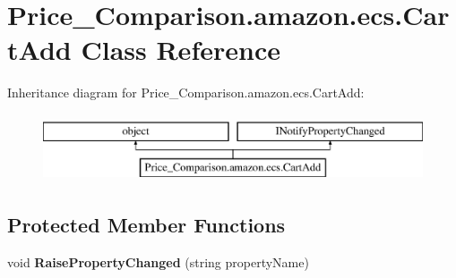 \hypertarget{class_price___comparison_1_1amazon_1_1ecs_1_1_cart_add}{\section{Price\-\_\-\-Comparison.\-amazon.\-ecs.\-Cart\-Add Class Reference}
\label{class_price___comparison_1_1amazon_1_1ecs_1_1_cart_add}
}


 


Inheritance diagram for Price\-\_\-\-Comparison.\-amazon.\-ecs.\-Cart\-Add\-:\begin{figure}[H]
\begin{center}
\leavevmode
\includegraphics[height=2.000000cm]{class_price___comparison_1_1amazon_1_1ecs_1_1_cart_add}
\end{center}
\end{figure}
\subsection*{Protected Member Functions}
\begin{DoxyCompactItemize}
\item 
\hypertarget{class_price___comparison_1_1amazon_1_1ecs_1_1_cart_add_ad9e4ba233609ebb7173f4260238e1a0d}{void {\bfseries Raise\-Property\-Changed} (string property\-Name)}\label{class_price___comparison_1_1amazon_1_1ecs_1_1_cart_add_ad9e4ba233609ebb7173f4260238e1a0d}

\end{DoxyCompactItemize}
